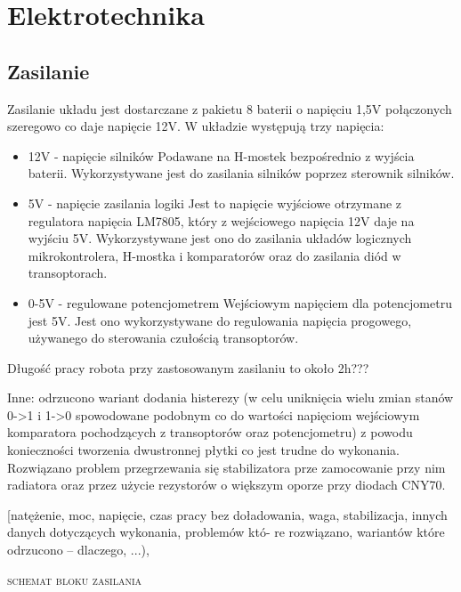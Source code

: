 \documentclass[11pt,a4paper]{article}
\begin{document}
  
\section{Elektrotechnika}
\subsection{Zasilanie}
Zasilanie układu jest dostarczane z pakietu 8 baterii o napięciu 1,5V połączonych szeregowo co daje napięcie 12V.
 W układzie występują trzy napięcia:
  \begin{itemize} 
  \item 12V - napięcie silników
  Podawane na H-mostek bezpośrednio z wyjścia baterii.
  Wykorzystywane jest do zasilania silników poprzez sterownik silników.
  \item 5V - napięcie zasilania logiki
  Jest to napięcie wyjściowe otrzymane z regulatora napięcia LM7805, który z wejściowego napięcia 12V daje na wyjściu 5V.
  Wykorzystywane jest ono do zasilania układów logicznych mikrokontrolera, H-mostka i komparatorów oraz do zasilania diód w transoptorach.
  \item 0-5V - regulowane potencjometrem
  Wejściowym napięciem dla potencjometru jest 5V. Jest ono wykorzystywane do regulowania napięcia progowego, używanego do sterowania czułością transoptorów.
  \end{itemize}

  Długość pracy robota przy zastosowanym zasilaniu to około 2h???

Inne: odrzucono wariant dodania histerezy (w celu uniknięcia wielu zmian stanów 0->1 i 1->0 spowodowane podobnym co do wartości napięciom wejściowym komparatora pochodzących z transoptorów oraz potencjometru) z powodu konieczności tworzenia dwustronnej płytki co jest trudne do wykonania.
Rozwiązano problem przegrzewania się stabilizatora prze zamocowanie przy nim radiatora oraz przez użycie rezystorów o większym oporze przy diodach CNY70.

[natężenie, moc, napięcie, czas pracy
bez doładowania, waga, stabilizacja, innych danych dotyczących wykonania, problemów któ-
re rozwiązano, wariantów które odrzucono – dlaczego, ...), 
    
  \textsc{schemat bloku zasilania}
\end{document}
